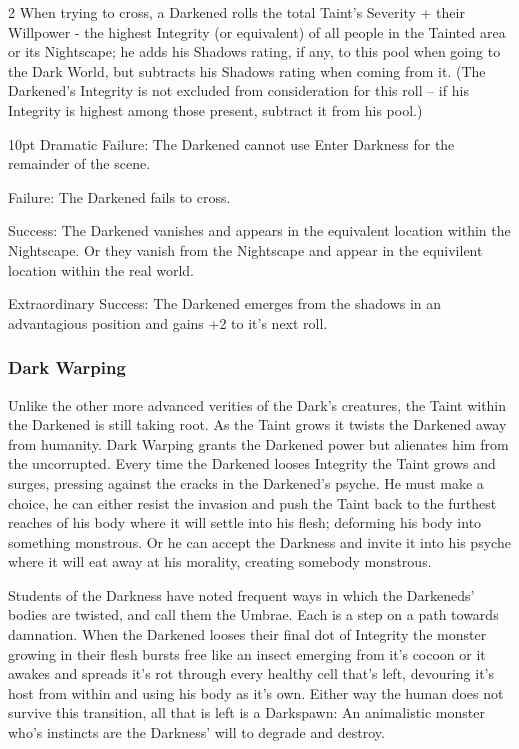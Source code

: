 \begin{multicols}{2}
When trying to cross, a Darkened rolls the total Taint's Severity + their Willpower - the highest Integrity (or equivalent) of all people in the Tainted area or its Nightscape; he adds his Shadows rating, if any, to this pool when going to the Dark World, but subtracts his Shadows rating when coming from it. (The Darkened's Integrity is not excluded from consideration for this roll -- if his Integrity is highest among those present, subtract it from his pool.) 

\begin{myindentpar}{10pt}
    Dramatic Failure: The Darkened cannot use Enter Darkness for the remainder of the scene. 
    
    Failure: The Darkened fails to cross. 
    
    Success: The Darkened vanishes and appears in the equivalent location within the Nightscape. Or they vanish from the Nightscape and appear in the equivilent location within the real world.
    
    Extraordinary Success: The Darkened emerges from the shadows in an advantagious position and gains +2 to it's next roll. 
\end{myindentpar}

\subsubsection*{Dark Warping}

Unlike the other more advanced verities of the Dark's creatures, the Taint within the Darkened is still taking root. As the Taint grows it twists the Darkened away from humanity. Dark Warping grants the Darkened power but alienates him from the uncorrupted. Every time the Darkened looses Integrity the Taint grows and surges, pressing against the cracks in the Darkened's psyche. He must make a choice, he can either resist the invasion and push the Taint back to the furthest reaches of his body where it will settle into his flesh; deforming his body into something monstrous. Or he can accept the Darkness and invite it into his psyche where it will eat away at his morality, creating somebody monstrous. 

Students of the Darkness have noted frequent ways in which the Darkeneds' bodies are twisted, and call them the Umbrae. Each is a step on a path towards damnation. When the Darkened looses their final dot of Integrity the monster growing in their flesh bursts free like an insect emerging from it's cocoon or it awakes and spreads it's rot through every healthy cell that's left, devouring it's host from within and using his body as it's own. Either way the human does not survive this transition, all that is left is a Darkspawn: An animalistic monster who's instincts are the Darkness' will to degrade and destroy. 


\end{multicols}
